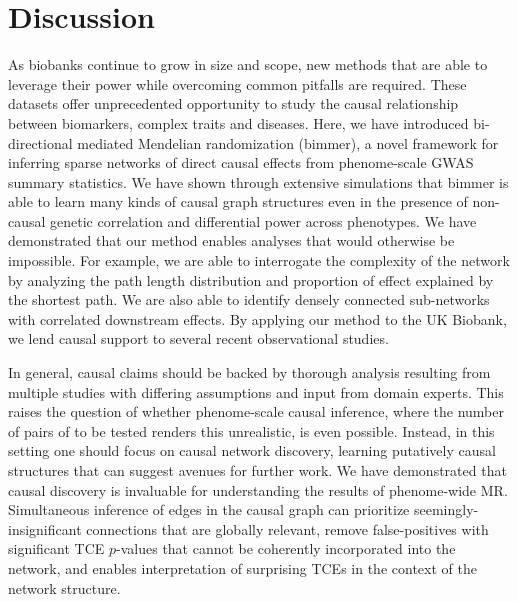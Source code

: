 \documentclass{article}
\begin{document}
\section{Discussion}\label{discussion}
As biobanks continue to grow in size and scope, new methods that are able to
leverage their power while overcoming common pitfalls are required.
These datasets offer unprecedented opportunity to study
the causal relationship between biomarkers, complex traits and diseases.
Here, we have introduced bi-directional mediated Mendelian randomization (bimmer),
a novel framework for inferring sparse networks of direct causal effects from phenome-scale
GWAS summary statistics. We have shown through extensive simulations that
bimmer is able to learn many kinds of causal graph structures even in the presence
of non-causal genetic correlation and differential power across phenotypes.
We have demonstrated that our method enables analyses that would otherwise be impossible. For example, 
we are able to interrogate the complexity of the network by analyzing the path length
distribution and proportion of effect explained by the shortest path. We are also able to 
identify densely connected sub-networks with correlated downstream effects. By applying our
method to the UK Biobank, we lend causal support to several recent observational studies.

In general, causal claims should be backed by thorough analysis resulting from
multiple studies with differing assumptions and input from domain experts. This raises the question
of whether phenome-scale causal inference, where the number of pairs of to be tested
renders this unrealistic, is even possible. Instead, in this setting one should focus on
causal network discovery, learning putatively causal structures that can suggest avenues for further
work. We have demonstrated that causal discovery is invaluable for understanding
the results of phenome-wide MR. Simultaneous inference of edges in
the causal graph can prioritize seemingly-insignificant connections that are globally relevant,
remove false-positives with significant TCE $p$-values that
cannot be coherently incorporated into the network, and enables interpretation of
 surprising TCEs in the context of the network structure.
\end{document}
